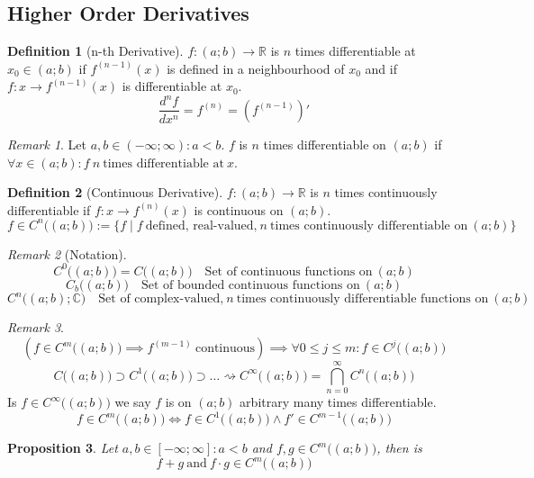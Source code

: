 \documentclass[english,titlepage]{uzhpub}
\theoremstyle{definition}
\newtheorem{definition}{Definition}[section]
\theoremstyle{plain}
\newtheorem{proposition}[definition]{Proposition}
\theoremstyle{remark}
\newtheorem*{remark}{Remark}
\theoremstyle{example}
\begin{document}
   \subsection{Higher Order Derivatives}
   \begin{definition}[n-th Derivative]
      \(f: (a; b) \to \mathbb{R}\) is \(n\) times differentiable at \(x_0 \in (a; b)\) if \(f^{(n-1)}(x)\) is defined in a neighbourhood of \(x_0\) and if \(f: x \to f^{(n-1)}(x)\) is differentiable at \(x_0\).
      \[\frac{d^n f}{dx^n} = f^{(n)} = (f^{(n-1)})'\]
   \end{definition}
   \begin{remark}
      Let \(a, b \in (-\infty; \infty): a < b\).
      \(f\) is \(n\) times differentiable on \((a; b)\) if \(\forall x \in (a; b): f~n~\text{times differentiable at}~x\).
   \end{remark}

   \begin{definition}[Continuous Derivative]
      \(f: (a; b) \to \mathbb{R}\) is \(n\) times continuously differentiable if \(f: x \to f^{(n)}(x)\) is continuous on \((a; b)\).
      \[f \in C^n\big((a; b)\big) := \{f \mid f~\text{defined, real-valued,}~n~\text{times continuously differentiable on}~(a;b)\}\]
   \end{definition}
   \begin{remark}[Notation]
      \[C^0\big((a;b)\big) = C\big((a; b)\big) \quad \text{Set of continuous functions on}~(a; b)\]
      \[C_b\big((a; b)\big) \quad \text{Set of bounded continuous functions on}~(a; b)\]
      \[C^n\big((a; b); \mathbb{C}\big) \quad \text{Set of complex-valued,}~n~\text{times continuously differentiable functions on}~(a; b)\]
   \end{remark}
   \begin{remark}
      \[(f \in C^m\big((a; b)\big) \implies f^{(m-1)}~\text{continuous}) \implies \forall 0 \leq j \leq m: f \in C^j\big((a; b)\big)\]
      \[C\big((a; b)\big) \supset C^1\big((a; b)\big) \supset \ldots \rightsquigarrow C^\infty\big((a; b)\big) = \bigcap_{n=0}^\infty C^n\big((a; b)\big)\]
      Is \(f \in C^\infty\big((a; b)\big)\) we say \(f\) is on \((a; b)\) arbitrary many times differentiable.
      \[f \in C^m\big((a; b)\big) \iff f \in C^1\big((a; b)\big) \land f' \in C^{m-1}\big((a; b)\big)\]
   \end{remark}

   \begin{proposition}\label{pro:func_add_in_Cm}
      Let \(a, b \in [-\infty; \infty]: a < b\) and \(f, g \in C^m\big((a;b)\big)\), then is
      \[f + g~\text{and}~f \cdot g \in C^m\big((a;b)\big)\]
   \end{proposition}
\end{document}
